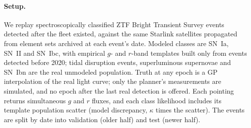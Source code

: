 \paragraph{Setup.} We replay spectroscopically classified ZTF Bright Transient Survey events \citep{Fremling2020,Perley2020} detected after the fleet existed, against the same Starlink satellites propagated from element sets archived at each event's date. Modeled classes are SN~Ia, SN~II and SN~Ibc, with empirical $g$- and $r$-band templates built only from events detected before 2020; tidal disruption events, superluminous supernovae and SN~Ibn are the real unmodeled population. Truth at any epoch is a GP interpolation of the real light curve; only the planner's measurements are simulated, and no epoch after the last real detection is offered. Each pointing returns simultaneous $g$ and $r$ fluxes, and each class likelihood includes its template population scatter (model discrepancy, $\kappa$ times the scatter). The events are split by date into validation (older half) and test (newer half).







